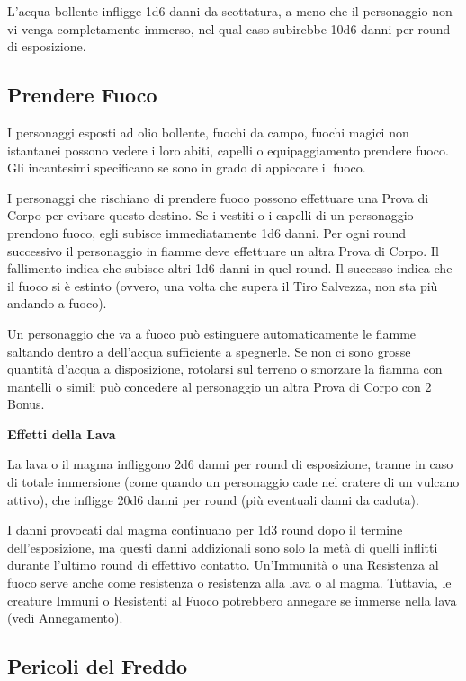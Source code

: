 \documentclass[12pt,a4paper,twoside,openany]{book}
\begin{document}
\begin{multicols}{2}
L'acqua bollente infligge 1d6 danni da scottatura, a meno che il personaggio non vi venga completamente immerso, nel qual caso subirebbe 10d6 danni per round di esposizione.

\subsection{Prendere Fuoco}

\label{prendere-fuoco}

I personaggi esposti ad olio bollente, fuochi da campo, fuochi magici non istantanei possono vedere i loro abiti, capelli o equipaggiamento prendere fuoco. Gli incantesimi specificano se sono in grado di appiccare il fuoco.

I personaggi che rischiano di prendere fuoco possono effettuare una Prova di Corpo per evitare questo destino. Se i vestiti o i capelli di un personaggio prendono fuoco, egli subisce immediatamente 1d6 danni. Per ogni round successivo il personaggio in fiamme deve effettuare un altra Prova di Corpo. Il fallimento indica che subisce altri 1d6 danni in quel round. Il successo indica che il fuoco si è estinto (ovvero, una volta che supera il Tiro Salvezza, non sta più andando a fuoco).

Un personaggio che va a fuoco può estinguere automaticamente le fiamme saltando dentro a dell'acqua sufficiente a spegnerle. Se non ci sono grosse quantità d'acqua a disposizione, rotolarsi sul terreno o smorzare la fiamma con mantelli o simili può concedere al personaggio un altra Prova di Corpo con 2 Bonus.

\textbf{Effetti della Lava}

La lava o il magma infliggono 2d6 danni per round di esposizione, tranne in caso di totale immersione (come quando un personaggio cade nel cratere di un vulcano attivo), che infligge 20d6 danni per round (più eventuali danni da caduta).

I danni provocati dal magma continuano per 1d3 round dopo il termine dell'esposizione, ma questi danni addizionali sono solo la metà di quelli inflitti durante l'ultimo round di effettivo contatto. Un'Immunità o una Resistenza al fuoco serve anche come resistenza o resistenza alla lava o al magma. Tuttavia, le creature Immuni o Resistenti al Fuoco potrebbero annegare se immerse nella lava (vedi Annegamento).


\subsection{Pericoli del Freddo}


\end{multicols}
\end{document}
